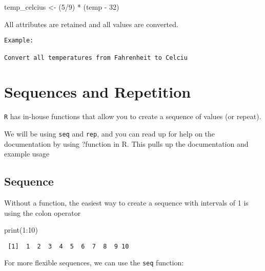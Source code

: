 \documentclass[
  letterpaper,
  DIV=11,
  numbers=noendperiod]{scrreprt}
\newenvironment{Shaded}{\begin{snugshade}}{\end{snugshade}}
\newcommand{\DecValTok}[1]{\textcolor[rgb]{0.68,0.00,0.00}{#1}}
\newcommand{\FunctionTok}[1]{\textcolor[rgb]{0.28,0.35,0.67}{#1}}
\newcommand{\NormalTok}[1]{\textcolor[rgb]{0.00,0.23,0.31}{#1}}
\newcommand{\OtherTok}[1]{\textcolor[rgb]{0.00,0.23,0.31}{#1}}
\newcommand{\SpecialCharTok}[1]{\textcolor[rgb]{0.37,0.37,0.37}{#1}}
\begin{document}
\begin{Shaded}
\begin{Highlighting}[]
\NormalTok{temp\_celcius }\OtherTok{\textless{}{-}}\NormalTok{ (}\DecValTok{5}\SpecialCharTok{/}\DecValTok{9}\NormalTok{) }\SpecialCharTok{*}\NormalTok{ (temp }\SpecialCharTok{{-}} \DecValTok{32}\NormalTok{)}
\end{Highlighting}
\end{Shaded}

All attributes are retained and all values are converted.

\begin{verbatim}
Example: 

Convert all temperatures from Fahrenheit to Celciu
\end{verbatim}

\section*{Sequences and Repetition}\label{sequences-and-repetition}


\texttt{R} has in-house functions that allow you to create a sequence of
values (or repeat).

We will be using \texttt{seq} and \texttt{rep}, and you can read up for
help on the documentation by using ?function in R. This pulls up the
documentation and example usage

\subsection*{Sequence}\label{sequence}

Without a function, the easiest way to create a sequence with intervals
of 1 is using the colon operator

\begin{Shaded}
\begin{Highlighting}[]
\FunctionTok{print}\NormalTok{(}\DecValTok{1}\SpecialCharTok{:}\DecValTok{10}\NormalTok{)}
\end{Highlighting}
\end{Shaded}

\begin{verbatim}
 [1]  1  2  3  4  5  6  7  8  9 10
\end{verbatim}

For more flexible sequences, we can use the \texttt{seq} function:
\end{document}
